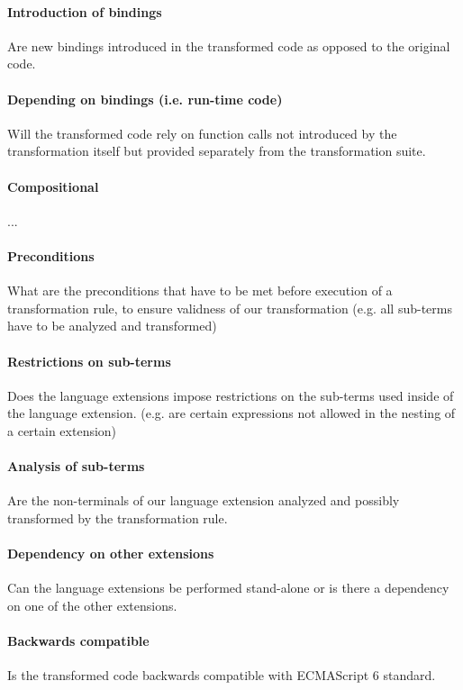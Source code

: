 \documentclass[10pt,a4paper]{article}
\begin{document}
\paragraph{Introduction of bindings}
Are new bindings introduced in the transformed code as opposed to the original code.

\paragraph{Depending on bindings (i.e. run-time code)}
Will the transformed code rely on function calls not introduced by the transformation itself but provided separately from the transformation suite.

\paragraph{Compositional}
...

\paragraph{Preconditions}
What are the preconditions that have to be met before execution of a transformation rule, to ensure validness of our transformation (e.g. all sub-terms have to be analyzed and transformed)

\paragraph{Restrictions on sub-terms}
Does the language extensions impose restrictions on the sub-terms used inside of the language extension. (e.g. are certain expressions not allowed in the nesting of a certain extension)

\paragraph{Analysis of sub-terms}
Are the non-terminals of our language extension analyzed and possibly transformed by the transformation rule.

\paragraph{Dependency on other extensions}
Can the language extensions be performed stand-alone or is there a dependency on one of the other extensions.

\paragraph{Backwards compatible}
Is the transformed code backwards compatible with ECMAScript 6 standard.
\end{document}
